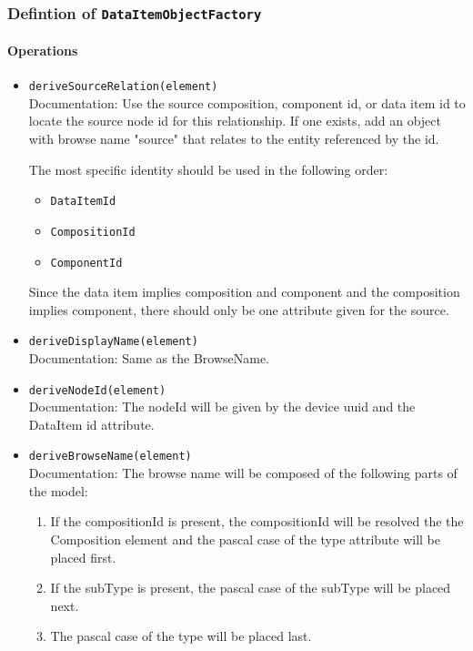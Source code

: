 \subsubsection{Defintion of \texttt{DataItemObjectFactory}} \label{type:DataItemObjectFactory}

\FloatBarrier



\paragraph{Operations}
\begin{itemize}
  \item \texttt{deriveSourceRelation(element)}\\
    Documentation: Use the source composition,  component id, or data item id to locate the source node id for this relationship. If one exists, add an object with  browse name "source" that relates to the entity referenced by the id. 

The most specific identity should be used in the following order:
\begin{itemize}
\item \texttt{DataItemId}
\item \texttt{CompositionId}
\item \texttt{ComponentId}
\end{itemize}

Since the data item implies composition and component and the composition implies component, there should only be one attribute given for the source.

  \item \texttt{deriveDisplayName(element)}\\
    Documentation: Same as the BrowseName.

  \item \texttt{deriveNodeId(element)}\\
    Documentation: The nodeId will be given by the device uuid and the DataItem id attribute.

  \item \texttt{deriveBrowseName(element)}\\
    Documentation: The browse name will be composed of the following parts of the model:

\begin{enumerate}
\item If the compositionId is present, the compositionId will be resolved the the Composition element and the pascal case of the type attribute will be placed first.
\item If the subType is present, the pascal case of the subType will be placed next.
\item The pascal case of the type will be placed last.
\end{enumerate}


\end{itemize}
